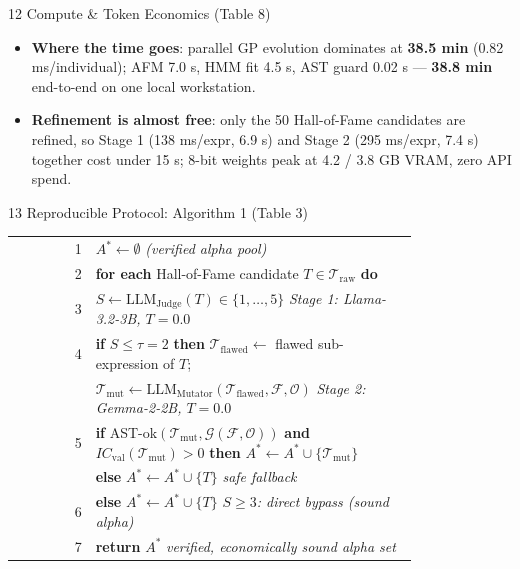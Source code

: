 \documentclass[final]{beamer}
\newcommand{\hl}[1]{\textbf{\color{navy2}#1}}
\newcommand{\gd}[1]{\textbf{\color{good}#1}}
\newcommand{\bd}[1]{\textbf{\color{bad}#1}}
\begin{document}
\begin{frame}[t]{}
\begin{columns}[t]
\begin{column}{0.325\textwidth}
\begin{block}{12 \; Compute \& Token Economics (Table 8)}
\begin{itemize}
  \item \hl{Where the time goes}: parallel GP evolution dominates at \bd{38.5 min} (0.82 ms/individual); AFM 7.0 s, HMM fit 4.5 s, AST guard 0.02 s --- \gd{38.8 min} end-to-end on one local workstation.
  \item \hl{Refinement is almost free}: only the 50 Hall-of-Fame candidates are refined, so Stage 1 (138 ms/expr, 6.9 s) and Stage 2 (295 ms/expr, 7.4 s) together cost under 15 s; 8-bit weights peak at 4.2 / 3.8 GB VRAM, zero API spend.
\end{itemize}
\end{block}

\begin{block}{13 \; Reproducible Protocol: Algorithm 1 (Table 3)}
{\footnotesize
\setlength{\tabcolsep}{0.26cm}
\renewcommand{\arraystretch}{1.04}
\begin{tabular}{@{}r@{\hskip0.3cm}L{0.80\linewidth}@{}}
1 & $A^{*} \leftarrow \emptyset$ \hfill \emph{(verified alpha pool)}\\
2 & \textbf{for each} Hall-of-Fame candidate $T \in \mathcal{T}_{\text{raw}}$ \textbf{do}\\
3 & \quad $S \leftarrow \mathrm{LLM}_{\text{Judge}}(T) \in \{1,\dots,5\}$ \hfill \emph{Stage 1: Llama-3.2-3B, $T{=}0.0$}\\
4 & \quad \textbf{if} $S \leq \tau = 2$ \textbf{then} $\mathcal{T}_{\text{flawed}} \leftarrow$ flawed sub-expression of $T$;\\
  & \quad\quad $\mathcal{T}_{\text{mut}} \leftarrow \mathrm{LLM}_{\text{Mutator}}(\mathcal{T}_{\text{flawed}}, \mathcal{F}, \mathcal{O})$ \hfill \emph{Stage 2: Gemma-2-2B, $T{=}0.0$}\\
5 & \quad\quad \textbf{if} AST-ok$(\mathcal{T}_{\text{mut}},\mathcal{G}(\mathcal{F},\mathcal{O}))$ \textbf{and} $IC_{\text{val}}(\mathcal{T}_{\text{mut}}) > 0$ \textbf{then} $A^{*} \leftarrow A^{*} \cup \{\mathcal{T}_{\text{mut}}\}$\\
  & \quad\quad \textbf{else} $A^{*} \leftarrow A^{*} \cup \{T\}$ \hfill \emph{safe fallback}\\
6 & \quad \textbf{else} $A^{*} \leftarrow A^{*} \cup \{T\}$ \hfill \emph{$S \geq 3$: direct bypass (sound alpha)}\\
7 & \textbf{return} $A^{*}$ \hfill \emph{verified, economically sound alpha set}\\
\end{tabular}}
\end{block}


\end{column}
\end{columns}
\end{frame}
\end{document}
